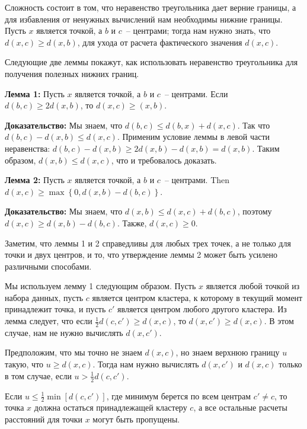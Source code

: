 Сложность состоит в том, что неравенство треугольника дает верние границы, а для избавления от ненужных вычислений нам необходимы нижние границы. Пусть \( x \) является точкой, а \( b \) и \( c \)~-- центрами; тогда нам нужно знать, что \( d(x, c) \ge d(x, b) \), для ухода от расчета фактического значения \( d(x, c) \).

Следующие две леммы покажут, как использовать неравенство треугольника для получения полезных нижних границ.

\textbf{Лемма 1:} Пусть \( x \) является точкой, а \( b \) и \( c \)~-- центрами. Если \( d(b, c) \ge 2d(x, b) \), то \( d(x, c) \ge (x, b) \).

\textbf{Доказательство:} Мы знаем, что \( d(b, c) \le d(b, x) + d(x, c) \). Так что \( d(b, c) - d(x, b) \le d(x, c) \). Применим условие леммы в левой части неравенства: \( d(b, c) - d(x, b) \ge 2d(x, b) - d(x, b) = d(x, b) \). Таким образом, \( d(x, b) \le d(x, c) \), что и требовалось доказать.

\textbf{Лемма 2:} Пусть \( x \) является точкой, а \( b \) и \( c \)~-- центрами. Then  \( d(x, c) \ge \max\left\{0, d(x, b) - d(b, c)\right\} \).

\textbf{Доказательство:} Мы знаем, что \( d(x, b) \le d(x, c) + d(b, c) \), поэтому \( d(x, c) \ge d(x, b) - d(b, c) \). Также, \( d(x, c) \ge 0 \).

Заметим, что леммы 1 и 2 справедливы для любых трех точек, а не только для точки и двух центров, и то, что утверждение леммы 2 может быть усилено различными способами.

Мы используем лемму 1 следующим образом. Пусть \( x \) является любой точкой из набора данных, пусть \( c \) является центром кластера, к которому в текущий момент принадлежит точка, и пусть \( c' \) является центром любого другого кластера. Из лемма следует, что если \( \frac{1}{2} d(c, c') \ge d(x, c) \), то \( d(x, c') \ge d(x, c) \). В этом случае, нам не нужно вычислять \( d(x, c') \).

Предположим, что мы точно не знаем \( d(x, c) \), но знаем верхнюю границу \( u \) такую, что \( u \ge d(x, c) \). Тогда нам нужно вычислять \( d(x, c') \) и \( d(x, c) \) только в том случае, если \( u > \frac{1}{2} d(c, c') \).

Если \( u \le \frac{1}{2} \min\left[d(c, c')\right] \), где минимум берется по всем центрам \( c' \ne c \), то точка \( x \) должна остаться принадлежащей кластеру \( c \), а все остальные расчеты расстояний для точки \( x \) могут быть пропущены.

